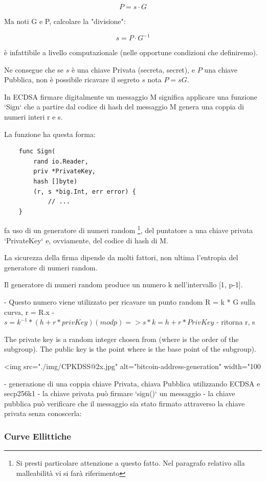 \documentclass{book}
\theoremstyle{definition}
\begin{document}
\[
    P = s \cdot G
\]

Ma noti G e P, calcolare la "divisione":

\[
    s = P \cdot G^{-1}
\]

è infattibile a livello computazionale (nelle opportune condizioni che definiremo).

Ne consegue che se $s$ è una chiave Privata (secreta, secret), e $P$ una chiave Pubblica, non è possibile ricavare il segreto $s$ nota $P = s G$.

In ECDSA firmare digitalmente un messaggio M significa applicare una funzione `Sign` che a partire dal codice di hash del messaggio M genera una coppia di numeri interi r e s.

La funzione ha questa forma:

\begin{lstlisting}
    func Sign(
        rand io.Reader, 
        priv *PrivateKey, 
        hash []byte) 
        (r, s *big.Int, err error) {
            // ...
    }
\end{lstlisting}

fa uso di un generatore di numeri random 
\footnote{Si presti particolare attenzione a questo fatto. Nel paragrafo relativo alla malleabilità vi si farà riferimento}, 
del puntatore a una chiave privata `PrivateKey` e, ovviamente, del codice di hash di M.

La sicurezza della firma dipende da molti fattori, non ultima l'entropia del generatore di numeri random.

Il generatore di numeri random produce un numero k nell'intervallo [1, p-1].

- Questo numero viene utilizzato per ricavare un punto random R = k * G sulla curva, r = R.x
- $s = k^{-1} * (h + r * privKey) (mod p) => s * k = h + r * PrivKey$
- ritorna r, s

The private key is a random integer chosen from  (where  is the order of the subgroup).
The public key is the point where  is the base point of the subgroup).

<img src="./img/CPKDSS@2x.jpg" alt="bitcoin-address-generation" width="100%

- generazione di una coppia chiave Privata, chiava Pubblica utilizzando ECDSA e secp256k1
- la chiave privata può firmare `sign()` un messaggio
- la chiave pubblica può verificare che il messaggio sia stato firmato attraverso la chiave privata senza conoscerla: %

\subsubsection{Curve Ellittiche}
\end{document}
